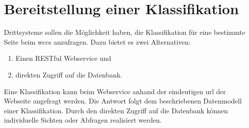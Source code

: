 \section{Bereitstellung einer Klassifikation}
    Drittsysteme sollen die Möglichkeit haben,
    die Klassifikation für eine bestimmte Seite beim \gls{wccs} anzufragen.
    Dazu bietet es zwei Alternativen:

    \begin{enumerate}
        \item Einen RESTful Webservice und
        \item direkten Zugriff auf die Datenbank.
    \end{enumerate}

    Eine Klassifikation kann beim Webservice anhand der eindeutigen \gls{url} der Webseite angefragt werden.
    Die Antwort folgt dem beschriebenen Datenmodell einer
    Klassifikation.
    Durch den direkten Zugriff auf die Datenbank können
    individuelle Sichten oder Abfragen realisiert werden.
